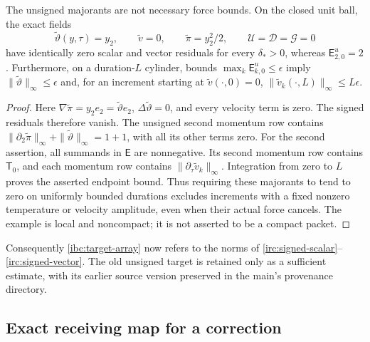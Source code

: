 \begin{proposition}\label{irc:unsigned-defect}
The unsigned majorants are not necessary force bounds.  On the closed
unit ball, the exact fields
\[
 \widetilde\vartheta(y,\tau)=y_2,\qquad
 \widetilde v=0,\qquad \widetilde\pi=y_2^2/2,\qquad
 \mathcal U=\mathcal D=\mathcal G=0
\]
have identically zero scalar and vector residuals for every
$\delta_*>0$, whereas $\mathsf E^u_{2,0}=2$.
Furthermore, on a duration-$L$ cylinder, bounds
$\max_k\mathsf E^u_{k,0}\leq\epsilon$ imply
$\|\widetilde\vartheta\|_\infty\leq\epsilon$ and, for an increment
starting at $\widetilde v(\cdot,0)=0$,
$\|\widetilde v_k(\cdot,L)\|_\infty\leq L\epsilon$.
\end{proposition}

\begin{proof}
Here $\nabla\widetilde\pi=y_2e_2=\widetilde\vartheta e_2$,
$\Delta\widetilde\vartheta=0$, and every velocity term is zero.
The signed residuals therefore vanish.  The unsigned second momentum
row contains $\|\partial_2\widetilde\pi\|_\infty+
\|\widetilde\vartheta\|_\infty=1+1$, with all its other terms zero.
For the second assertion, all summands in $\mathsf E$ are nonnegative.
Its second momentum row contains $\mathsf T_0$, and each momentum row
contains $\|\partial_\tau\widetilde v_k\|_\infty$.  Integration from
zero to $L$ proves the asserted endpoint bound.  Thus requiring these
majorants to tend to zero on uniformly bounded durations excludes
increments with a fixed nonzero temperature or velocity amplitude,
even when their actual force cancels.  The example is local and
noncompact; it is not asserted to be a compact packet.
\end{proof}

Consequently \eqref{ibc:target-array} now refers to the norms of
\eqref{irc:signed-scalar}--\eqref{irc:signed-vector}.  The old
unsigned target is retained only as a sufficient estimate, with its
earlier source version preserved in the main's provenance directory.

\subsection{Exact receiving map for a correction}

